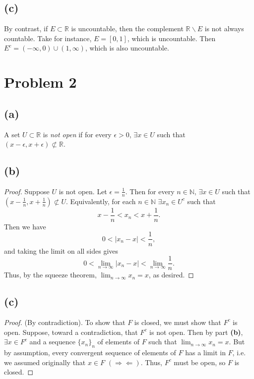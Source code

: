 \documentclass{article}
\newcommand{\R}{\mathbb{R}} %
\newcommand{\N}{\mathbb{N}} %
\begin{document}
\subsection*{(c)}
By contrast, if $E \subset \R$ is uncountable, then the complement $\R \backslash E$ is not always countable. Take for instance, $E = [0 , 1]$, which is uncountable. Then \\$E^c = (-\infty, 0) \cup (1, \infty)$, which is also uncountable.
\section*{Problem 2}
\subsection*{(a)}
A set $U \subset \R$ is \textit{not open} if for every $\epsilon > 0$, $\exists x \in U$ such that \\$(x-\epsilon, x+\epsilon) \not\subset \R$.

\subsection*{(b)}
\begin{proof}
	Suppose $U$ is not open. Let $\epsilon = \frac{1}{n}$. Then for every $n \in \N$, $\exists x \in U$ such that $(x-\frac{1}{n}, x + \frac{1}{n}) \not \subset U$. Equivalently, for each $n \in \N$ $\exists x_n \in U^c$ such that
	\begin{equation}
		x - \frac{1}{n} < x_n < x + \frac{1}{n}.
	\end{equation}
	Then we have
	\begin{equation}
		0 < |x_n - x| < \frac{1}{n},
	\end{equation}
	and taking the limit on all sides gives
	\begin{equation}
		0 < \lim_{n \to \infty} |x_n - x| < \lim_{n \to \infty} \frac{1}{n}.
	\end{equation}
	Thus, by the squeeze theorem, $\lim_{n \to \infty} x_n = x$, as desired.
\end{proof}

\subsection*{(c)}
\begin{proof}
	(By contradiction). To show that $F$ is closed, we must show that $F^c$ is open. Suppose, toward a contradiction, that $F^c$ is not open. Then by part \textbf{(b)}, $\exists x \in F^c$ and a sequence $\{x_n\}_n$ of elements of $F$ such that $\lim_{n\to\infty} x_n = x$. But by assumption, every convergent sequence of elements of $F$ has a limit in $F$, i.e. we assumed originally that $x \in F$ $(\Rightarrow\Leftarrow)$. Thus, $F^c$ must be open, so $F$ is closed.
\end{proof}
\end{document}
